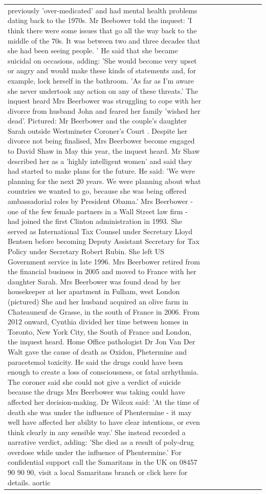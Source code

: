 \begin{table}[H]
\begin{tabular}{lllrlllll}
previously 'over-medicated' and had mental health problems dating back to the 1970s. Mr Beebower told the inquest: 'I think there were some issues that go all the way back to the middle of the 70s. It was between two and three decades that she had been seeing people. ' He said that she became suicidal on occasions, adding: 'She would become very upset or angry and would make these kinds of statements and, for example, lock herself in the bathroom. 'As far as I'm aware she never undertook any action on any of these threats.' The inquest heard Mrs Beerbower was struggling to cope with her divorce from husband John and feared her family 'wished her dead'. Pictured: Mr Beerbower and the couple's daughter Sarah outside Westminster Coroner's Court . Despite her divorce not being finalised, Mrs Beerbower become engaged to David Shaw in May this year, the inquest heard. Mr Shaw described her as a 'highly intelligent women' and said they had started to make plans for the future. He said: 'We were planning for the next 20 years. We were planning about what countries we wanted to go, because she was being offered ambassadorial roles by President Obama.' Mrs Beerbower - one of the few female partners in a Wall Street law firm - had joined the first Clinton administration in 1993. She served as International Tax Counsel under Secretary Lloyd Bentsen before becoming Deputy Assistant Secretary for Tax Policy under Secretary Robert Rubin. She left US Government service in late 1996. Mrs Beerbower retired from the financial business in 2005 and moved to France with her daughter Sarah. Mrs Beerbower was found dead by her housekeeper at her apartment in Fulham, west London (pictured) She and her husband acquired an olive farm in Chateauneuf de Grasse, in the south of France in 2006. From 2012 onward, Cynthia divided her time between homes in Toronto, New York City, the South of France and London, the inquest heard. Home Office pathologist Dr Jon Van Der Walt gave the cause of death as Oxidon, Phetermine and paracetemol toxicity. He said the drugs could have been enough to create a loss of consciousness, or fatal arrhythmia. The coroner said she could not give a verdict of suicide because the drugs Mrs Beerbower was taking could have affected her decision-making. Dr Wilcox said: 'At the time of death she was under the influence of Phentermine - it may well have affected her ability to have clear intentions, or even think clearly in any sensible way.' She instead recorded a narrative verdict, adding: 'She died as a result of poly-drug overdose while under the influence of Phentermine.' For confidential support call the Samaritans in the UK on 08457 90 90 90, visit a local Samaritans branch or click here for details. aortic \\

\end{tabular}
\end{table}
